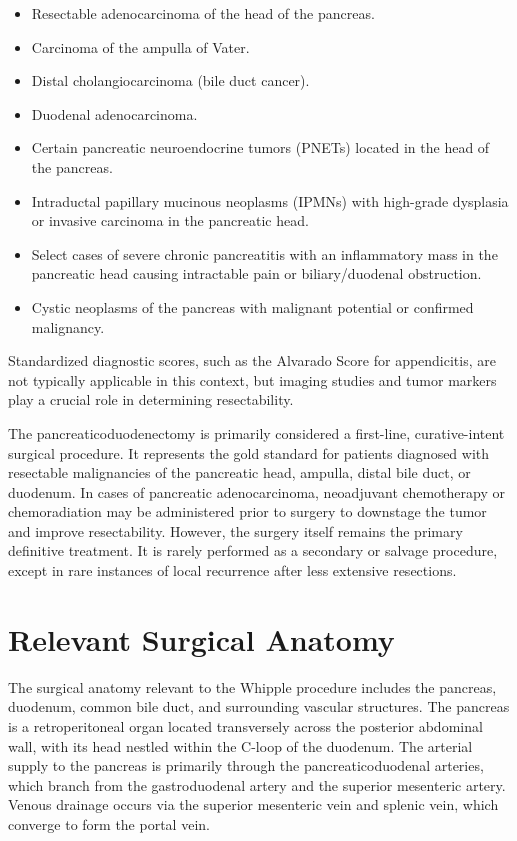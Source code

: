 \begin{itemize}
  \item Resectable adenocarcinoma of the head of the pancreas.
  \item Carcinoma of the ampulla of Vater.
  \item Distal cholangiocarcinoma (bile duct cancer).
  \item Duodenal adenocarcinoma.
  \item Certain pancreatic neuroendocrine tumors (PNETs) located in the head of the pancreas.
  \item Intraductal papillary mucinous neoplasms (IPMNs) with high-grade dysplasia or invasive carcinoma in the pancreatic head.
  \item Select cases of severe chronic pancreatitis with an inflammatory mass in the pancreatic head causing intractable pain or biliary/duodenal obstruction.
  \item Cystic neoplasms of the pancreas with malignant potential or confirmed malignancy.
\end{itemize}

Standardized diagnostic scores, such as the Alvarado Score for appendicitis, are not typically applicable in this context, but imaging studies and tumor markers play a crucial role in determining resectability.

The pancreaticoduodenectomy is primarily considered a first-line, curative-intent surgical procedure. It represents the gold standard for patients diagnosed with resectable malignancies of the pancreatic head, ampulla, distal bile duct, or duodenum. In cases of pancreatic adenocarcinoma, neoadjuvant chemotherapy or chemoradiation may be administered prior to surgery to downstage the tumor and improve resectability. However, the surgery itself remains the primary definitive treatment. It is rarely performed as a secondary or salvage procedure, except in rare instances of local recurrence after less extensive resections.

\section*{Relevant Surgical Anatomy}
The surgical anatomy relevant to the Whipple procedure includes the pancreas, duodenum, common bile duct, and surrounding vascular structures. The pancreas is a retroperitoneal organ located transversely across the posterior abdominal wall, with its head nestled within the C-loop of the duodenum. The arterial supply to the pancreas is primarily through the pancreaticoduodenal arteries, which branch from the gastroduodenal artery and the superior mesenteric artery. Venous drainage occurs via the superior mesenteric vein and splenic vein, which converge to form the portal vein.

